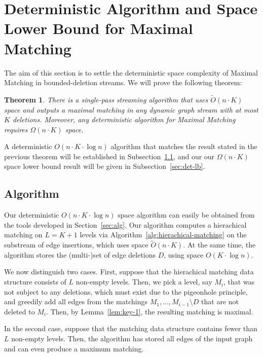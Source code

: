 \documentclass[11pt,a4paper]{article}
\newtheorem{theorem}{Theorem}
\begin{document}
\section{Deterministic Algorithm and Space Lower Bound for \textsf{Maximal Matching}} \label{sec:det}

The aim of this section is to settle the deterministic space complexity of \textsf{Maximal Matching} in bounded-deletion streams. We will prove the following theorem:


\setcounter{thmsaved}{\value{theorem}}
\setcounter{theorem}{\value{counterDET}}
\addtocounter{theorem}{-1}
\begin{theorem}
There is a single-pass streaming algorithm that uses $\tilde{O}(n \cdot K)$ space and outputs a maximal matching in any dynamic graph stream with at most $K$ deletions. Moreover, any deterministic algorithm for \textsf{Maximal Matching} requires $\Omega(n \cdot K)$ space.
\end{theorem}
\setcounter{theorem}{\value{thmsaved}}

A deterministic $O(n \cdot K \cdot \log n)$ algorithm that matches the result stated in the previous theorem will be established in Subsection~\ref{sec:det-alg}, and our our $\Omega(n \cdot K)$ space lower bound result will be given in Subsection~\ref{sec:det-lb}.

\subsection{Algorithm} \label{sec:det-alg}
Our deterministic $O(n \cdot K \cdot \log n)$ space algorithm can easily be obtained from the tools developed in Section~\ref{sec:alg}. Our algorithm computes a hierachical matching on $L=K+1$ levels via Algorithm~\ref{alg:hierachical-matching} on the substream of edge insertions, which uses space $\tilde{O}(n \cdot K)$. At the same time, the algorithm stores the (multi-)set of edge deletions $D$, using space $O(K \cdot \log n)$. 

We now distinguish two cases. First, suppose that the hierachical matching data structure consists of $L$ non-empty levels. Then, we pick a level, say $M_i$, that was not subject to any deletions, which must exist due to the pigeonhole principle, and greedily add all edges from the matchings $M_1, \dots, M_{i-1} \setminus D$ that are not deleted to $M_i$. Then, by Lemma~\ref{lem:key-1}, the resulting matching is maximal.

In the second case, suppose that the matching data structure contains fewer than $L$ non-empty levels. Then, the algorithm has stored all edges of the input graph and can even produce a maximum matching. 
\end{document}
